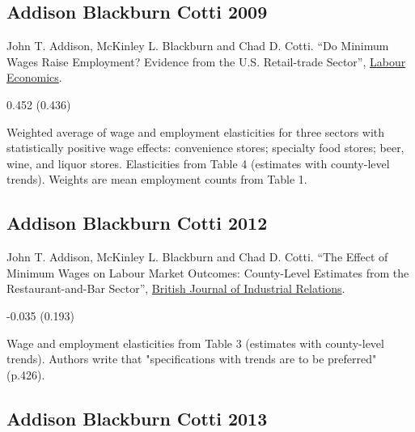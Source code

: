 \onehalfspacing
\subsection*{Addison Blackburn Cotti 2009}
\vspace{-0.7em}

\noindent John T. Addison, McKinley L. Blackburn and Chad D. Cotti. ``Do Minimum Wages Raise Employment? Evidence from the U.S. Retail-trade Sector'', \href{https://doi.org/10.1016/j.labeco.2008.12.007}{Labour Economics}.

\vspace{0.7em}

 0.452 (0.436)

\vspace{0.7em}

 Weighted average of wage and employment elasticities for three sectors with statistically positive wage effects: convenience stores; specialty food stores; beer, wine, and liquor stores. Elasticities from Table 4 (estimates with county-level trends). Weights are mean employment counts from Table 1.

\subsection*{Addison Blackburn Cotti 2012}
\vspace{-0.7em}

\noindent John T. Addison, McKinley L. Blackburn and Chad D. Cotti. ``The Effect of Minimum Wages on Labour Market Outcomes: County-Level Estimates from the Restaurant-and-Bar Sector'', \href{https://doi.org/10.1111/j.1467-8543.2010.00819.x}{British Journal of Industrial Relations}.

\vspace{0.7em}

 -0.035 (0.193)

\vspace{0.7em}

 Wage and employment elasticities from Table 3 (estimates with county-level trends). Authors write that "specifications with trends are to be preferred" (p.426).

\subsection*{Addison Blackburn Cotti 2013}
\vspace{-0.7em}

